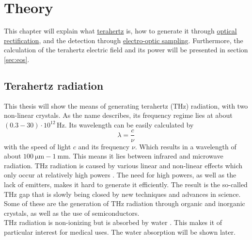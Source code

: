 \chapter{Theory}
\label{sec:theory}
This chapter will explain what \hyperref[sec:terahertz]{terahertz} is, how to generate it through \hyperref[sec:optic_ref]{optical rectification}, and the detection through \hyperref[sec:eos]{electro-optic sampling}.
Furthermore, the calculation of the terahertz electric field and its power will be presented in section \ref{sec:eos}.
\section{Terahertz radiation}
\label{sec:terahertz}
This thesis will show the means of generating terahertz ($\si{\tera\hertz}$) radiation, with two non-linear crystals.
As the name describes, its frequency regime lies at about \\${(0.3-30)\cdot10^{12}\,\si{\hertz}}$.
Its wavelength can be easily calculated by
\begin{equation}
    \lambda = \frac{c}{\nu}
\end{equation}
with the speed of light $c$ and its frequency $\nu$.
Which results in a wavelength of about $\SI{100}{\micro\meter}-\SI{1}{\milli\meter}$.
This means it lies between infrared and microwave radiation.
$\si{\tera\hertz}$ radiation is caused by various linear and non-linear effects which only occur at relatively high powers \cite{Thz_sources}.
The need for high powers, as well as the lack of emitters, makes it hard to generate it efficiently.
The result is the so-called $\si{\tera\hertz}$ gap that is slowly being closed by new techniques and advances in science.
Some of these are the generation of $\si{\tera\hertz}$ radiation through organic and inorganic crystals, as well as the use of semiconductors.
\\
$\si{\tera\hertz}$ radiation is non-ionizing but is absorbed by water \cite{water_absorption}.
This makes it of particular interest for medical uses.
The water absorption will be shown later. 


